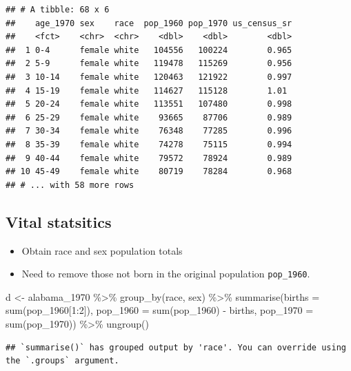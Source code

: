 \documentclass[
]{book}
\newenvironment{Shaded}{\begin{snugshade}}{\end{snugshade}}
\newcommand{\AttributeTok}[1]{\textcolor[rgb]{0.77,0.63,0.00}{#1}}
\newcommand{\DecValTok}[1]{\textcolor[rgb]{0.00,0.00,0.81}{#1}}
\newcommand{\FunctionTok}[1]{\textcolor[rgb]{0.00,0.00,0.00}{#1}}
\newcommand{\NormalTok}[1]{#1}
\newcommand{\OtherTok}[1]{\textcolor[rgb]{0.56,0.35,0.01}{#1}}
\newcommand{\SpecialCharTok}[1]{\textcolor[rgb]{0.00,0.00,0.00}{#1}}
\providecommand{\tightlist}{%
  \setlength{\itemsep}{0pt}\setlength{\parskip}{0pt}}
\begin{document}
\begin{verbatim}
## # A tibble: 68 x 6
##    age_1970 sex    race  pop_1960 pop_1970 us_census_sr
##    <fct>    <chr>  <chr>    <dbl>    <dbl>        <dbl>
##  1 0-4      female white   104556   100224        0.965
##  2 5-9      female white   119478   115269        0.956
##  3 10-14    female white   120463   121922        0.997
##  4 15-19    female white   114627   115128        1.01 
##  5 20-24    female white   113551   107480        0.998
##  6 25-29    female white    93665    87706        0.989
##  7 30-34    female white    76348    77285        0.996
##  8 35-39    female white    74278    75115        0.994
##  9 40-44    female white    79572    78924        0.989
## 10 45-49    female white    80719    78284        0.968
## # ... with 58 more rows
\end{verbatim}

\hypertarget{vital-statsitics-2}{%
\subsection{Vital statsitics}\label{vital-statsitics-2}}

\begin{itemize}
\tightlist
\item
  Obtain race and sex population totals
\item
  Need to remove those not born in the original population \texttt{pop\_1960}.
\end{itemize}

\begin{Shaded}
\begin{Highlighting}[]
\NormalTok{d }\OtherTok{\textless{}{-}}\NormalTok{ alabama\_1970 }\SpecialCharTok{\%\textgreater{}\%}
  \FunctionTok{group\_by}\NormalTok{(race, sex) }\SpecialCharTok{\%\textgreater{}\%}
  \FunctionTok{summarise}\NormalTok{(}\AttributeTok{births =} \FunctionTok{sum}\NormalTok{(pop\_1960[}\DecValTok{1}\SpecialCharTok{:}\DecValTok{2}\NormalTok{]),}
            \AttributeTok{pop\_1960 =} \FunctionTok{sum}\NormalTok{(pop\_1960) }\SpecialCharTok{{-}}\NormalTok{ births,}
            \AttributeTok{pop\_1970 =} \FunctionTok{sum}\NormalTok{(pop\_1970)) }\SpecialCharTok{\%\textgreater{}\%}
  \FunctionTok{ungroup}\NormalTok{()}
\end{Highlighting}
\end{Shaded}

\begin{verbatim}
## `summarise()` has grouped output by 'race'. You can override using the `.groups` argument.
\end{verbatim}
\end{document}
